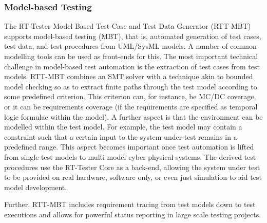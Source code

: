 \subsubsection{Model-based Testing}
The RT-Tester Model Based Test Case and Test Data Generator (RTT-MBT) \cite{VSI-mbt-man} 
supports model-based testing (MBT), that is, automated generation of test cases, test
data, and test procedures from UML\allowbreak{}/SysML models. A number of common modelling
tools can be used as front-ends for this. 
%
The most important technical challenge in model-based test automation is the extraction of test cases from test models.
%
RTT-MBT combines an SMT solver with a technique akin to bounded model checking so as to extract finite paths through the test model according to some predefined criterion.
%
This criterion can, for instance, be MC/DC coverage, or it can be requirements coverage (if the requirements are specified as temporal logic formulae within the model).
%
A further aspect is that the environment can be modelled within the test model.
%
For example, the test model may contain a constraint such that a certain input to the system-under-test remains in a predefined range.
%
This aspect becomes important once test automation is lifted from single test models to multi-model cyber-physical systems.
%
The derived test procedures use the RT-Tester Core as a back-end, allowing the
system under test to be provided on real hardware, software only, or even
just simulation to aid test model development.

Further, RTT-MBT includes requirement tracing from test models down to test executions
and allows for powerful status reporting in large scale testing projects.
%
%
%
